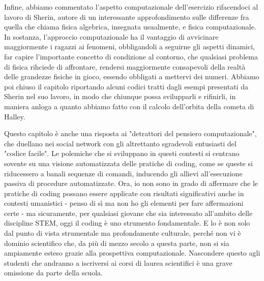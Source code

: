 Infine, abbiamo commentato l'aspetto computazionale dell'esercizio rifacendoci al lavoro di Sherin\cite{Sherin}, autore di un interessante approfondimento sulle differenze fra quella che chiama fisica algebrica, insegnata usualmente, e fisica computazionale. In sostanza, l'approccio computazionale ha il vantaggio di avvicinare maggiormente i ragazzi ai fenomeni, obbligandoli a seguirne gli aspetti dinamici, far capire l'importante concetto di condizione al contorno, che qualsiasi problema di fisica rihciede di affrontare, rendersi maggiormente consapevoli della realtà delle grandezze fisiche in gioco, essendo obbligati a mettervi dei numeri. Abbiamo poi chiuso il capitolo riportando alcuni codici tratti dagli esempi presentati da Sherin nel suo lavoro, in modo che chiunque possa svilupparli e rifinirli, in maniera anloga a quanto abbiamo fatto con il calcolo dell'orbita della cometa di Halley.    

Questo capitolo è anche una risposta ai "detrattori del pensiero computazionale", che duellano nei social network con gli altrettanto sgradevoli entusiasti del "codice facile". Le polemiche che si sviluppano in questi contesti si centrano sovente su una visione automatizzata delle pratiche di coding, come se queste si riducessero a banali sequenze di comandi, inducendo gli allievi all'esecuzione passiva di procedure automatizzate. Ora, io non sono in grado di affermare che le pratiche di coding possano essere applicate con risultati significativi anche in contesti umanistici - penso di sì ma non ho gli elementi per fare affermazioni certe - ma sicuramente, per qualsiasi giovane che sia interessato all'ambito delle discipline STEM, oggi il coding è uno strumento fondamentale. E lo è non solo dal punto di vista strumentale ma profondamente culturale, perché non vi è dominio scientifico che, da più di mezzo secolo a questa parte, non si sia ampiamente esteso grazie alla prospettiva computazionale. Nascondere questo agli studenti che andranno a iscriversi ai corsi di laurea scientifici è una grave omissione da parte della scuola. 
